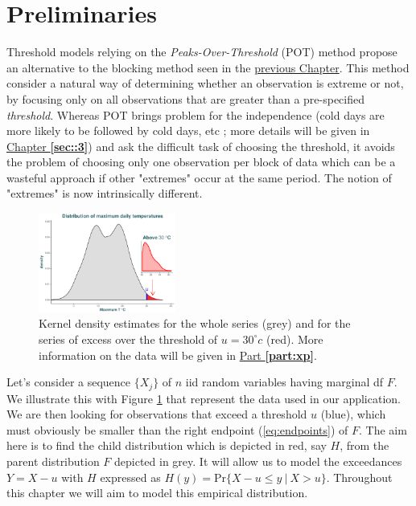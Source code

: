 
\section{Preliminaries}\label{sec::2.1}

Threshold models relying on the \emph{Peaks-Over-Threshold} (POT) method propose an alternative to the blocking method seen in the \hyperref[sec::1]{previous Chapter}. This method consider a natural way of determining whether an observation is extreme or not, by focusing only on all observations that are greater than a pre-specified \emph{threshold}. 
Whereas POT brings problem for the independence (cold days are more likely to be followed by cold days, etc ; more details will be given in \hyperref[sec::3]{Chapter \textbf{\ref{sec::3}}}) and ask the difficult task of choosing the threshold, it avoids the problem of choosing only one observation per block of data which can be a wasteful approach if other "extremes" occur at the same period. The notion of "extremes" is now intrinsically different.

\begin{figure}
	\centering
	\includegraphics[width=0.4\textwidth]{pot_plot.pdf} %
	\caption{Kernel density estimates for the whole series (grey) and for the series of excess over the threshold of $u=30^{\circ} c$ (red). More information on the data will be given in \hyperref[part:xp]{Part \textbf{\ref{part:xp}}}.}
	\label{fig:pot_plot}
\end{figure}

Let's consider a sequence $\{X_j\}$ of $n$ iid random variables having marginal df $F$. We illustrate this with Figure \ref{fig:pot_plot} that represent the data used in our application. We are then looking for observations that exceed a threshold $u$ (blue), which must obviously be smaller than the right endpoint (\ref{eq:endpoints}) of $F$. The aim here is to find the child distribution which is depicted in red, say $H$, from the parent distribution $F$ depicted in grey. It will allow us to model the exceedances $Y=X-u$  with $H$ expressed as $\boxed{H(y)=\text{Pr}\{X-u\leq y \ | \ X>u\}}$.
Throughout this chapter we will aim to model this empirical distribution.

